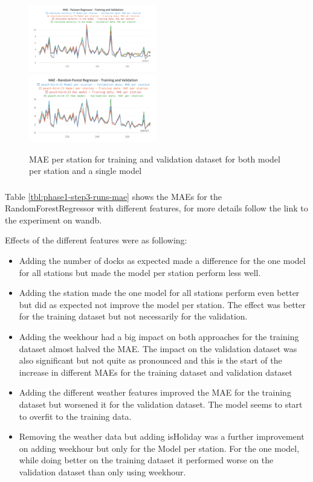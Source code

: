 \documentclass[a4paper]{article}
\begin{document}
    \begin{figure}[h]
        \includegraphics[width=0.5\textwidth]{mae-pr-perstation}\hfill
        \includegraphics[width=0.5\textwidth]{mae-rfr-comparison}
        \caption{MAE per station for training and validation dataset for both model per station and a single model}
        \label{fig:simple-pr-rfr-mae-perstation}
    \end{figure}


    \subsubsection*{}

    Table \ref{tbl:phase1-step3-runs-mae} shows the MAEs for the RandomForestRegressor with different features, for more
    details follow the link to the experiment on wandb.

    Effects of the different features were as following:
    \begin{itemize}
        \item  Adding the number of docks as expected made a difference for
        the one model for all stations but made the model per station perform less well.
        \item Adding the station made the one model for all stations perform even better but did as expected not improve
        the model per station. The effect was better for the training dataset but not necessarily for the validation.
        \item Adding the weekhour had a big impact on both approaches for the training dataset almost halved the MAE.
        The impact on the validation dataset was also significant but not quite as pronounced and this is the start of the
        increase in different MAEs for the training dataset and validation dataset
        \item Adding the different weather features improved the MAE for the training dataset but worsened it for the validation
        dataset. The model seems to start to overfit to the training data.
        \item Removing the weather data but adding isHoliday was a further improvement on adding weekhour but only for the Model
        per station. For the one model, while doing better on the training dataset it performed worse on the validation dataset
        than only using weekhour.
    \end{itemize}
\end{document}
